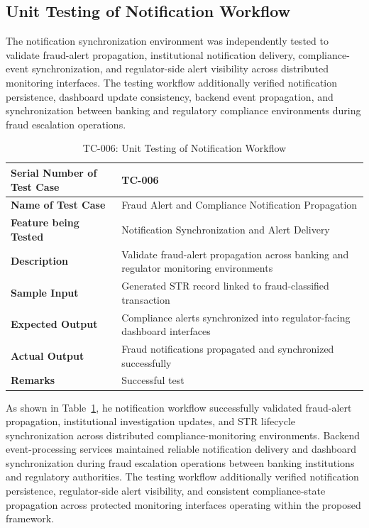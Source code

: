 \subsection[Unit Testing of Notification Workflow]{\textbf{Unit Testing of Notification Workflow}}

The notification synchronization environment was independently tested to validate fraud-alert propagation, institutional notification delivery, compliance-event synchronization, and regulator-side alert visibility across distributed monitoring interfaces. The testing workflow additionally verified notification persistence, dashboard update consistency, backend event propagation, and synchronization between banking and regulatory compliance environments during fraud escalation operations.


\begin{table}[H]
\centering
\caption{TC-006: Unit Testing of Notification Workflow}
\label{tab:notification_workflow_test}
\vspace{0.2cm}

\begin{tabular}{|p{4.2cm}|p{9cm}|}
\hline
\textbf{Serial Number of Test Case} & TC-006 \\ \hline
\textbf{Name of Test Case} & Fraud Alert and Compliance Notification Propagation \\ \hline
\textbf{Feature being Tested} & Notification Synchronization and Alert Delivery \\ \hline
\textbf{Description} & Validate fraud-alert propagation across banking and regulator monitoring environments \\ \hline
\textbf{Sample Input} & Generated STR record linked to fraud-classified transaction \\ \hline
\textbf{Expected Output} & Compliance alerts synchronized into regulator-facing dashboard interfaces \\ \hline
\textbf{Actual Output} & Fraud notifications propagated and synchronized successfully \\ \hline
\textbf{Remarks} & Successful test \\ \hline
\end{tabular}
\end{table}


As shown in Table~\ref{tab:notification_workflow_test}, he notification workflow successfully validated fraud-alert propagation, institutional investigation updates, and STR lifecycle synchronization across distributed compliance-monitoring environments. Backend event-processing services maintained reliable notification delivery and dashboard synchronization during fraud escalation operations between banking institutions and regulatory authorities. The testing workflow additionally verified notification persistence, regulator-side alert visibility, and consistent compliance-state propagation across protected monitoring interfaces operating within the proposed framework.



